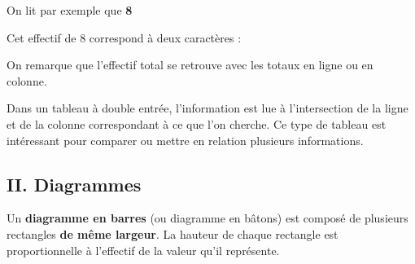 \begin{Exemple}
\begin{center}
\end{center}

On lit par exemple que \textbf{\textcolor{Couleur8}{8}} \ligne

Cet effectif de 8 correspond à deux caractères : \ligne

On remarque que l'effectif total se retrouve avec les totaux en ligne ou en colonne.
\end{Exemple}

\begin{Remarque}
Dans un tableau à double entrée, l'information est lue à l'intersection de la ligne et de la colonne correspondant à ce que l'on cherche. Ce type de tableau est intéressant pour comparer ou mettre en relation plusieurs informations.
\end{Remarque}

\newpage
\subsection*{II. Diagrammes}

\begin{Définition}
Un \textbf{diagramme en barres} (ou diagramme en bâtons) est composé de plusieurs rectangles \textbf{de même largeur}. La hauteur de chaque rectangle est proportionnelle à l'effectif de la valeur qu'il représente.
\end{Définition}

